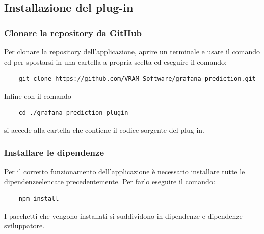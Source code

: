 
\subsection{Installazione del plug-in}
\subsubsection{Clonare la repository da GitHub}%
Per clonare la repository dell'applicazione, aprire un terminale e usare il comando cd per spostarsi in una cartella a propria scelta ed eseguire il comando:
\begin{verbatim}
	git clone https://github.com/VRAM-Software/grafana_prediction.git
\end{verbatim}
Infine con il comando 
\begin{verbatim}
	cd ./grafana_prediction_plugin
\end{verbatim}
si accede alla cartella che contiene il codice sorgente del plug-in.

\subsubsection{Installare le dipendenze\glo}%
Per il corretto funzionamento dell'applicazione è necessario installare tutte le dipendenze\glosp elencate precedentemente. Per farlo eseguire il comando:
\begin{verbatim}
	npm install
\end{verbatim}
I pacchetti che vengono installati si suddividono in dipendenze e dipendenze sviluppatore.

